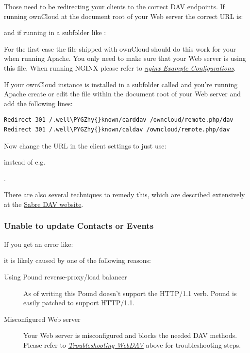 \documentclass[letterpaper,10pt,english]{sphinxmanual}
\def\PYGZhy{\char`\-}
\begin{document}
Those need to be redirecting your clients to the correct DAV endpoints. If
running ownCloud at the document root of your Web server the correct URL is:


and if running in a subfolder like :


For the first case the  file shipped with ownCloud should do
this work for your when running Apache. You only need to make sure that your
Web server is using this file. When running NGINX please refer to
{\hyperref[installation/nginx_examples::doc]{\emph{\emph{nginx Example Configurations}}}}.

If your ownCloud instance is installed in a subfolder called  and
you're running Apache create or edit the  file within the
document root of your Web server and add the following lines:

\begin{Verbatim}[commandchars=\\\{\}]
Redirect 301 /.well\PYGZhy{}known/carddav /owncloud/remote.php/dav
Redirect 301 /.well\PYGZhy{}known/caldav /owncloud/remote.php/dav
\end{Verbatim}

Now change the URL in the client settings to just use:


instead of e.g.

.

There are also several techniques to remedy this, which are described extensively at
the \href{http://sabre.io/dav/service-discovery/}{Sabre DAV website}.


\subsubsection{Unable to update Contacts or Events}
\label{issues/general_troubleshooting:unable-to-update-contacts-or-events}
If you get an error like:


it is likely caused by one of the following reasons:
\begin{description}
\item[{Using Pound reverse-proxy/load balancer}] \leavevmode
As of writing this Pound doesn't support the HTTP/1.1 verb.
Pound is easily \href{http://www.apsis.ch/pound/pound\_list/archive/2013/2013-08/1377264673000}{patched}
to support HTTP/1.1.

\item[{Misconfigured Web server}] \leavevmode
Your Web server is misconfigured and blocks the needed DAV methods.
Please refer to {\hyperref[issues/general_troubleshooting:trouble\string-webdav\string-label]{\emph{Troubleshooting WebDAV}}} above for troubleshooting steps.

\end{description}
\end{document}
